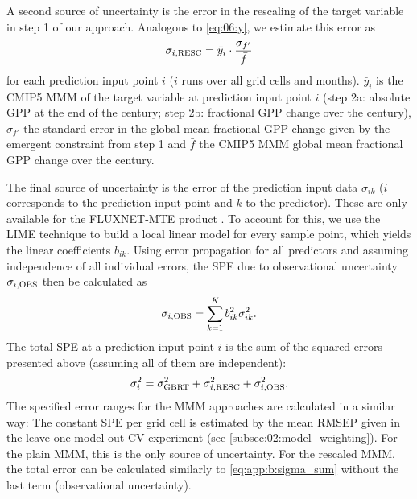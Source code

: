 A second source of uncertainty is the error in the rescaling of the target
variable in step 1 of our approach. Analogous to \cref{eq:06:y}, we estimate
this error as
\begin{equation}
  \sigma_{i, \textnormal{RESC}} = \bar{y}_i \cdot \frac{\sigma_{f'}}{\bar{f}}
  \label{eq:app:b:sigma_rescaling}
\end{equation}
for each prediction input point $i$ ($i$ runs over all grid cells and months).
$\bar{y}_i$ is the \acs{CMIP}5 \acf{MMM} of the target variable at prediction
input point $i$ (step 2a: absolute \ac{GPP} at the end of the  century;
step 2b: fractional \ac{GPP} change over the  century), $\sigma_{f'}$
the standard error in the global mean fractional \acs{GPP} change given by the
emergent constraint from step 1 and $\bar{f}$ the \acs{CMIP}5 \ac{MMM} global
mean fractional \ac{GPP} change over the  century.

The final source of uncertainty is the error of the prediction input data
$\sigma_{ik}$ ($i$ corresponds to the prediction input point and $k$ to the
predictor). These are only available for the FLUXNET-MTE product
\autocite{Jung2011}. To account for this, we use the \acf{LIME} technique
 to build a local linear
model for every sample point, which yields the linear coefficients $b_{ik}$.
Using error propagation for all predictors and assuming independence of all
individual errors, the \ac{SPE} due to observational uncertainty $\sigma_{i,
  \textnormal{OBS}}$ then be calculated as
\begin{equation}
  \sigma_{i, \textnormal{OBS}} = \sum_{k=1}^{K} b_{ik}^2 \sigma_{ik}^2.
  \label{eq:app:b:sigma_obs}
\end{equation}
The total \ac{SPE} at a prediction input point $i$ is the sum of the squared
errors presented above (assuming all of them are independent):
\begin{equation}
  \sigma_i^2 = \sigma_{\textnormal{GBRT}}^2 + \sigma_{i, \textnormal{RESC}}^2 +
  \sigma_{i, \textnormal{OBS}}^2.
  \label{eq:app:b:sigma_sum}
\end{equation}
The specified error ranges for the \ac{MMM} approaches are calculated in a
similar way: The constant \ac{SPE} per grid cell is estimated by the mean
\ac{RMSEP} given in the leave-one-model-out \ac{CV} experiment (see
\cref{subsec:02:model_weighting}). For the plain \ac{MMM}, this is the only
source of uncertainty. For the rescaled \ac{MMM}, the total error can be
calculated similarly to \cref{eq:app:b:sigma_sum} without the last term
(observational uncertainty).


